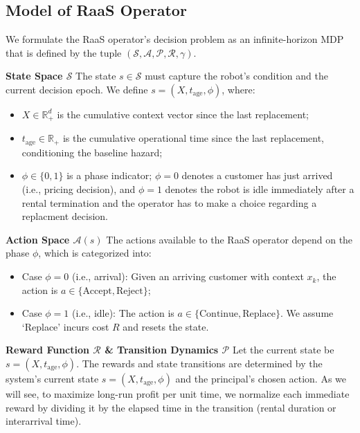 \documentclass[conference]{IEEEtran}
\begin{document}
\subsection{Model of RaaS Operator}
\label{sec:mraas}



We formulate the RaaS operator's decision problem as an infinite-horizon  MDP that is defined by the tuple $(\mathcal{S}, \mathcal{A}, \mathcal{P}, \mathcal{R}, \gamma)$.

\textbf{State Space $\mathcal{S}$} The state $s \in \mathcal{S}$ must capture the robot's condition and the current decision epoch. We define $s = (X, t_{\text{age}}, \phi)$, where:
\begin{itemize}
    \item $X \in \mathbb{R}_+^d$ is the cumulative context vector since the last replacement;
    \item $t_{\text{age}} \in \mathbb{R}_+$ is the cumulative operational time since the last replacement, conditioning the baseline hazard;
    \item $\phi \in \{0, 1\}$ is a phase indicator; $\phi=0$ denotes a customer has just arrived (i.e., pricing decision), and $\phi=1$ denotes the robot is idle immediately after a rental termination and the operator has to make a choice regarding a replacment decision.
\end{itemize}

\textbf{Action Space $\mathcal{A}(s)$} The actions available to the RaaS operator depend on the phase $\phi$, which is categorized into:
\begin{itemize}
    \item Case $\phi=0$ (i.e., arrival): Given an arriving customer with context $x_k$, the action is $a \in \{\text{Accept}, \text{Reject}\}$;%
    \item Case $\phi=1$ (i.e., idle): The action is $a \in \{\text{Continue}, \text{Replace}\}$. We assume `Replace' incurs cost $R$ and resets the state.
\end{itemize}

\textbf{Reward Function $\mathcal{R}$ \& Transition Dynamics $\mathcal{P}$} Let the current state be $s=(X, t_{\text{age}}, \phi)$. The rewards and state transitions are determined by the system's current state $s=(X, t_{\text{age}}, \phi)$ and the principal's chosen action. As we will see, to maximize long-run profit per unit time, we normalize each immediate reward by dividing it by the elapsed time in the transition (rental duration or interarrival time).
\end{document}
